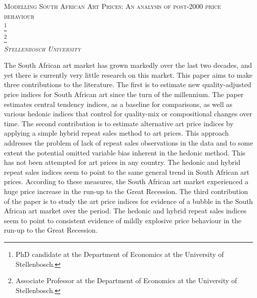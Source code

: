 \documentclass[12pt,]{article}
\title{}
\author{}
\date{}
\let\rmarkdownfootnote\footnote%
\def\footnote{\protect\rmarkdownfootnote}
\begin{document}
\maketitle

\begin{center}
\Large\scshape{Modelling South African Art Prices: An analysis of post-2000 price behaviour} \\ 
\vspace{1em}
\large{}\footnote{PhD candidate at the Department of Economics at the University of Stellenbosch.} \\
\large{}\footnote{Associate Professor at the Department of Economics at the University of Stellenbosch.} \\
\normalsize\textit{Stellenbosch University} \\
\normalsize{} 
\end{center}\begin{small}

The South African art market has grown markedly over the last two decades, and yet there is currently very little research on this market. This paper aims to make three contributions to the literature. The first is to estimate new quality-adjusted price indices for South African art since the turn of the millennium. The paper estimates central tendency indices, as a baseline for comparisons, as well as various hedonic indices that control for quality-mix or compositional changes over time. The second contribution is to estimate alternative art price indices by applying a simple hybrid repeat sales method to art prices. This approach addresses the problem of lack of repeat sales observations in the data and to some extent the potential omitted variable bias inherent in the hedonic method. This has not been attempted for art prices in any country. The hedonic and hybrid repeat sales indices seem to point to the same general trend in South African art prices. According to these measures, the South African art market experienced a huge price increase in the run-up to the Great Recession. The third contribution of the paper is to study the art price indices for evidence of a bubble in the South African art market over the period. The hedonic and hybrid repeat sales indices seem to point to consistent evidence of mildly explosive price behaviour in the run-up to the Great Recession. 

\vspace{0.5em}
\end{small}\renewcommand{\thefootnote}{\arabic{footnote}}
\end{document}
